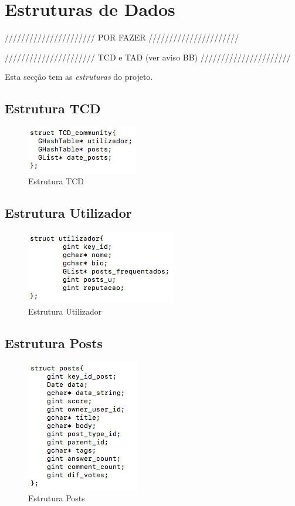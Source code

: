 \documentclass[a4paper]{article}
\begin{document}
\section{Estruturas de Dados}
\label{sec:estruturas}

////////////////////// POR FAZER //////////////////////

////////////////////// TCD e TAD (ver aviso BB) //////////////////////

Esta secção tem as \emph{estruturas} do projeto.

\subsection{Estrutura TCD}
\begin{figure}[ht]
\centering
\includegraphics[scale=0.50]{image_tcd}
\caption{Estrutura TCD} 
\label{img:tcd}
\end{figure}

\subsection{Estrutura Utilizador}
\begin{figure}[ht]
\centering
\includegraphics[scale=0.50]{image_utilizador}
\caption{Estrutura Utilizador} 
\label{img:utilizador}
\end{figure}

\subsection{Estrutura Posts}
\begin{figure}[ht]
\centering
\includegraphics[scale=0.50]{image_posts}
\caption{Estrutura Posts} 
\label{img:posts}
\end{figure}
\end{document}
